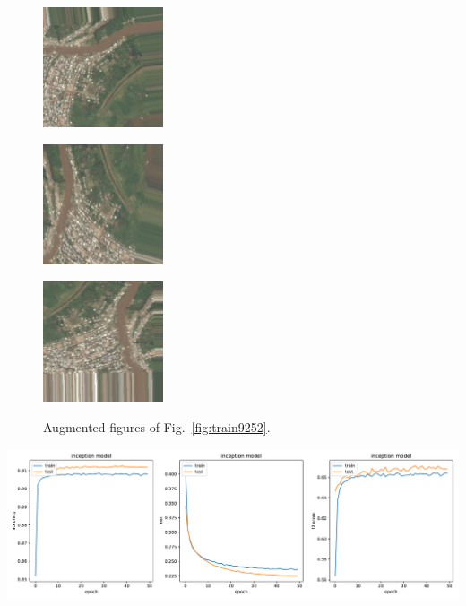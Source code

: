 \documentclass[11pt,oneside,a4paper]{article}
\newenvironment{Figure}
{\par\medskip\noindent\minipage{\linewidth}}
{\endminipage\par\medskip}
\begin{document}
\begin{figure}[htbp]
    \hspace{-4mm}
    \begin{minipage}{0.33\linewidth}
        \centering
        \includegraphics[width=1.4in]{train_9252_0_175.jpg}\\
    \end{minipage}
    \begin{minipage}{0.33\linewidth}
        \centering
        \includegraphics[width=1.4in]{train_9252_0_598.jpg}\\
    \end{minipage}
     \begin{minipage}{0.33\linewidth}
        \centering
        \includegraphics[width=1.4in]{train_9252_0_1710.jpg}\\
    \end{minipage}
    \caption{Augmented figures of Fig.~\ref{fig:train9252}.} 
    \label{fig:train_augment}
\end{figure}
\begin{Figure}
 \centering
 \includegraphics[width=1.\linewidth, height=0.33\linewidth]{inception_metrics.pdf}
 \label{fig:inception_metrics}
\end{Figure}
\end{document}
